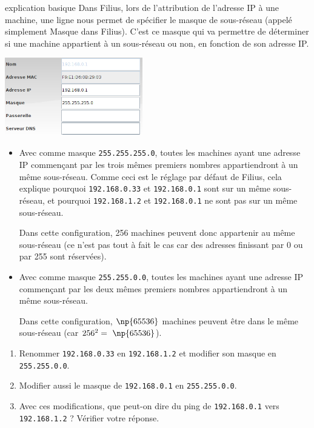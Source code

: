 \documentclass[a4paper,dvipsnames]{article}
\begin{document}
\medskip

\begin{methode}[breakable]{explication basique}{}
  Dans Filius, lors de l'attribution de l'adresse IP à une machine, une ligne nous permet de spécifier le {\color{red}masque de sous-réseau} (appelé simplement \og{}Masque\fg{} dans Filius). C'est ce masque qui va permettre de déterminer si une machine appartient à un sous-réseau ou non, en fonction de son adresse IP. 

  \begin{center}
    \includegraphics[width=6cm]{img/f4.png}
  \end{center}

  \begin{itemize}
    \item Avec comme masque \texttt{255.255.255.0}, toutes les machines ayant une adresse IP commençant par les trois mêmes premiers nombres appartiendront à un même sous-réseau. Comme ceci est le réglage par défaut de Filius, cela explique pourquoi \texttt{192.168.0.33} et \texttt{192.168.0.1} sont sur un même sous-réseau, et pourquoi \texttt{192.168.1.2} et \texttt{192.168.0.1} ne sont pas sur un même sous-réseau.

      Dans cette configuration, 256 machines peuvent donc appartenir au même sous-réseau (ce n'est pas tout à fait le cas car des adresses finissant par 0 ou par 255 sont réservées).

    \item Avec comme masque \texttt{255.255.0.0}, toutes les machines ayant une adresse IP commençant par les deux mêmes premiers nombres appartiendront à un même sous-réseau.

      Dans cette configuration, $\np{65536}$ machines peuvent être dans le même sous-réseau (car $256^2=~\np{65536}$).
  \end{itemize}
\end{methode}

\medskip

\begin{activite}[breakable]{}{}
  \begin{enumerate}
    \item Renommer \texttt{192.168.0.33} en \texttt{192.168.1.2} et modifier son masque en \texttt{255.255.0.0}.
    \item Modifier aussi le masque de \texttt{192.168.0.1} en \texttt{255.255.0.0}.
    \item Avec ces modifications, que peut-on dire du ping de \texttt{192.168.0.1} vers \texttt{192.168.1.2} ? Vérifier votre réponse.
  \end{enumerate}
\end{activite}
\end{document}
